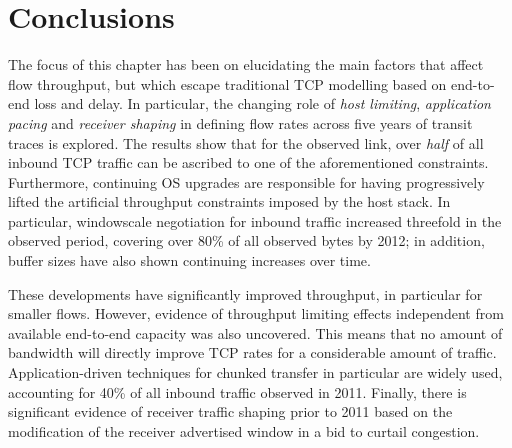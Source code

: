 \section{Conclusions}
\label{section:malawi:conclusion}

The focus of this chapter has been on elucidating the main factors that affect flow throughput, but which escape traditional TCP modelling based on end-to-end loss and delay. 
In particular, the changing role of \emph{host limiting}, \emph{application pacing} and \emph{receiver shaping} in defining flow rates across five years of transit traces is explored.
The results show that for the observed link, over \emph{half} of all inbound TCP traffic can be ascribed to one of the aforementioned constraints.
Furthermore, continuing OS upgrades are responsible for having progressively lifted the artificial throughput constraints imposed by the host stack. 
In particular, windowscale negotiation for inbound traffic increased threefold in the observed period, covering over 80\% of all observed bytes by 2012; in addition, buffer sizes have also shown continuing increases over time.

These developments have significantly improved throughput, in particular for smaller flows. However, evidence of throughput limiting effects independent from available end-to-end capacity was also uncovered. 
This means that no amount of bandwidth will directly improve TCP rates for a considerable amount of traffic.
Application-driven techniques for chunked transfer in particular are widely used, accounting for 40\% of all inbound traffic observed in 2011.
Finally, there is significant evidence of receiver traffic shaping prior to 2011 based on the modification of the receiver advertised window in a bid to curtail congestion.


